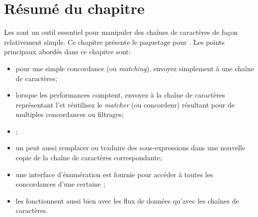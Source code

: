\documentclass[a4paper,10pt,twoside]{book}
\begin{document}
\section{Résumé du chapitre}

Les \expregs sont un outil essentiel pour manipuler des chaînes de
caractères de façon relativement simple.
Ce chapitre présente le paquetage \pkgregex pour \pharo. Les points
principaux abordés dans ce chapitre sont:

\begin{itemize}
\item pour une simple concordance (ou \emph{matching}), envoyez
  simplement  à une chaîne de caractères;
\item lorsque les performances comptent, envoyez  à la
  chaîne de caractères représentant l'\expreg et réutilisez le
  \emph{matcher} (ou concordeur) résultant pour de multiples
  concordances ou filtrages;
\item {};
\item un \regexmatch peut aussi remplacer ou traduire des
  sous-expressions dans une nouvelle copie de la chaîne de caractères correspondante;
\item une interface d'énumération est fournie pour accéder à toutes
  les concordances d'une certaine \expreg;
\item les \expregs fonctionnent aussi bien avec les flux de données
  qu'avec les chaînes de caractères.
\end{itemize}


\ifx\wholebook\relax\else
   
   
\end{document}
